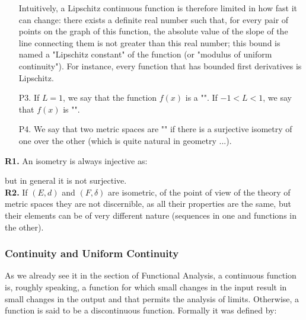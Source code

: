 \begin{enumerate}
		Intuitively, a Lipschitz continuous function is therefore limited in how fast it can change: there exists a definite real number such that, for every pair of points on the graph of this function, the absolute value of the slope of the line connecting them is not greater than this real number; this bound is named a "Lipschitz constant" of the function (or "modulus of uniform continuity"). For instance, every function that has bounded first derivatives is Lipschitz.
		
		\item[P3.] If $L=1$, we say that the function $f(x)$ is a "". If $-1<L<1$, we say that $f(x)$ is "\label{strictly contracting}".
		
		\item[P4.] We say that two metric spaces are "" if there is a surjective isometry of one over the other (which is quite natural in geometry ...).
	\end{enumerate}
	\begin{tcolorbox}[title=Remarks,arc=10pt,breakable,drop lifted shadow,
  skin=enhanced,
  skin first is subskin of={enhancedfirst}{arc=10pt,no shadow},
  skin middle is subskin of={enhancedmiddle}{arc=10pt,no shadow},
  skin last is subskin of={enhancedlast}{drop lifted shadow}]
	\textbf{R1.} An isometry is always injective as:
	
	but in general it is not surjective.\\
	
	\textbf{R2.} If $(E,d)$ and $(F,\delta)$ are isometric, of the point of view of the theory of metric spaces they are not discernible, as all their properties are the same, but their elements can be of very different nature (sequences in one and functions in the other).\\
	\end{tcolorbox}
	
	\pagebreak
	\subsubsection{Continuity and Uniform Continuity}\label{continuity and uniform continuity}
	As we already see it in the section of Functional Analysis, a continuous function is, roughly speaking, a function for which small changes in the input result in small changes in the output and that permits the analysis of limits. Otherwise, a function is said to be a discontinuous function. Formally it was defined by:
	
